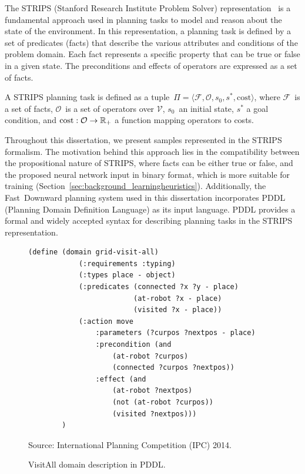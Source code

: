 The STRIPS (Stanford Research Institute Problem Solver) representation~\cite{Fikes.Nilsson/1971} is a fundamental approach used in planning tasks to model and reason about the state of the environment. In this representation, a planning task is defined by a set of predicates (facts) that describe the various attributes and conditions of the problem domain. Each fact represents a specific property that can be true or false in a given state. The preconditions and effects of operators are expressed as a set of facts.

\begin{definition}
    \label{def:stripsplanningtask}
    A STRIPS planning task is defined as a tuple~$\Pi=\langle\mathcal{F},\mathcal{O},s_0,s^*, \text{cost}\rangle$, where $\mathcal{F}$~is a set of facts, $\mathcal{O}$~is a set of operators over $\mathcal{V}$, $s_0$~an initial state, $s^*$ a goal condition, and $\text{cost}:\mathcal{O}\rightarrow\mathbb{R}_{+}$ a function mapping operators to costs.
\end{definition}

Throughout this dissertation, we present samples represented in the STRIPS formalism. The motivation behind this approach lies in the compatibility between the propositional nature of STRIPS, where facts can be either true or false, and the proposed neural network input in binary format, which is more suitable for training (Section~\ref{sec:background_learningheuristics}). Additionally, the Fast~Downward planning system used in this dissertation incorporates PDDL (Planning Domain Definition Language) as its input language. PDDL provides a formal and widely accepted syntax for describing planning tasks in the STRIPS representation.

\begin{figure}[ht]
\caption{VisitAll domain description in PDDL.}
\label{fig:pddl}
\addvspace{\baselineskip}
\centering
\begin{lstlisting}[basicstyle=\ttfamily]
        (define (domain grid-visit-all)
            (:requirements :typing)
            (:types place - object)
            (:predicates (connected ?x ?y - place)
                         (at-robot ?x - place)
                         (visited ?x - place))
            (:action move
                :parameters (?curpos ?nextpos - place)
                :precondition (and
                    (at-robot ?curpos)
                    (connected ?curpos ?nextpos))
                :effect (and 
                    (at-robot ?nextpos)
                    (not (at-robot ?curpos))
                    (visited ?nextpos)))
        )
\end{lstlisting}
Source: International Planning Competition (IPC) 2014.
\end{figure}

